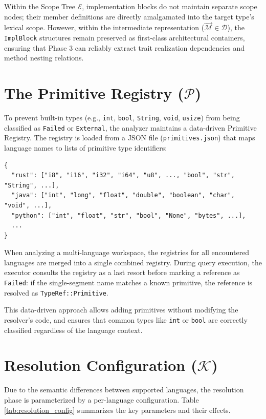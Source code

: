 Within the Scope Tree $\mathcal{E}$, implementation blocks do not
maintain separate scope nodes;
their member definitions are directly amalgamated into the target
type's lexical scope. However,
within the intermediate representation ($\vec{\mathcal{M}} \in
\mathcal{D}$), the \texttt{ImplBlock}
structures remain preserved as first-class architectural containers,
ensuring that Phase 3 can
reliably extract trait realization dependencies and method nesting relations.

\section{The Primitive Registry ($\mathcal{P}$)}
\label{sec:primitive_registry}

To prevent built-in types (e.g., \texttt{int}, \texttt{bool},
\texttt{String}, \texttt{void}, \texttt{usize}) from being classified
as \texttt{Failed} or \texttt{External}, the analyzer maintains a
data-driven Primitive Registry. The registry is loaded from a JSON
file (\texttt{primitives.json}) that maps language names to lists of
primitive type identifiers:

{\footnotesize
\begin{verbatim}
{
  "rust": ["i8", "i16", "i32", "i64", "u8", ..., "bool", "str", "String", ...],
  "java": ["int", "long", "float", "double", "boolean", "char", "void", ...],
  "python": ["int", "float", "str", "bool", "None", "bytes", ...],
  ...
}
\end{verbatim}
}

When analyzing a multi-language workspace, the registries for all
encountered languages are merged into a single combined registry.
During query execution, the executor consults the registry as a last
resort before marking a reference as \texttt{Failed}: if the
single-segment name matches a known primitive, the reference is
resolved as \texttt{TypeRef::Primitive}.

This data-driven approach allows adding primitives without modifying
the resolver's code, and ensures that common types like \texttt{int}
or \texttt{bool} are correctly classified regardless of the language context.

\section{Resolution Configuration ($\mathcal{K}$)}
\label{sec:resolution_config}

Due to the semantic differences between supported languages, the
resolution phase is parameterized by a per-language configuration.
Table \ref{tab:resolution_config} summarizes the key parameters and
their effects.

